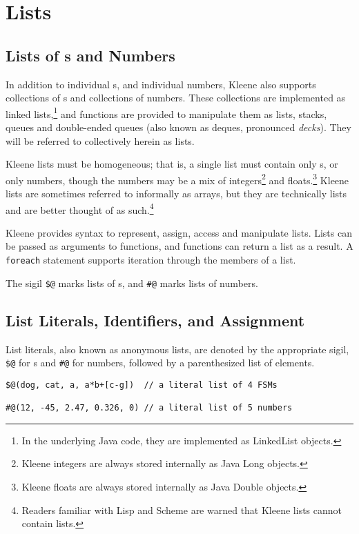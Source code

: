 \chapter{Lists}

\label{chapt:lists}

\section{Lists of \fsm{}s and Numbers}

In addition to individual \fsm{}s, and individual numbers,
Kleene also supports collections of \fsm{}s and collections of numbers.
These collections are implemented as linked lists,\footnote{In the
underlying Java code, they are implemented as LinkedList objects.} and
functions are provided to manipulate them as lists, stacks, queues and
double-ended queues (also known as deques, pronounced \emph{decks}).
They will be referred to collectively herein as lists.

Kleene lists must be homogeneous; that is, a single list must contain
only \fsm{}s, or only numbers, though the numbers may be a mix of
integers\footnote{Kleene integers are always stored internally as Java
Long objects.} and floats.\footnote{Kleene floats are always stored
internally as Java Double objects.}  Kleene lists are sometimes referred
to informally as arrays, but they are technically lists and are better
thought of as such.\footnote{Readers familiar with Lisp and Scheme are
warned that Kleene lists cannot contain lists.}

Kleene provides syntax to represent, assign, access and manipulate lists.
Lists can be passed as arguments to functions, and functions can
return a list as a result.  A \texttt{foreach} statement supports
iteration through the members of a list.

The sigil \verb!$@! marks lists of \fsm{}s, and \verb!#@! marks lists of
numbers. 

\section{List Literals, Identifiers, and Assignment}

List literals, also known as anonymous lists, are denoted by the
appropriate sigil, \verb!$@! for \fsm{}s and \verb!#@! for numbers, followed
by a parenthesized list of elements.

\begin{Verbatim}
$@(dog, cat, a, a*b+[c-g])  // a literal list of 4 FSMs 

#@(12, -45, 2.47, 0.326, 0) // a literal list of 5 numbers
\end{Verbatim}

